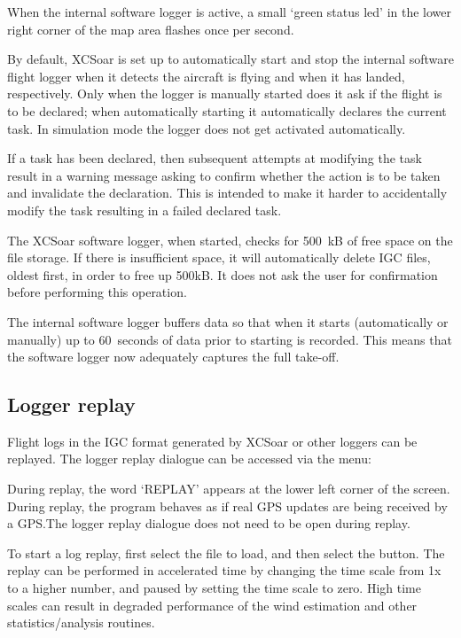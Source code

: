 When the internal software logger is active, a small `green status led' in the
lower right corner of the map area flashes once per second.

By default, XCSoar is set up to automatically start and stop the
internal software flight logger when it detects the aircraft is flying
and when it has landed, respectively.  Only when the logger is
manually started does it ask if the flight is to be declared; when
automatically starting it automatically declares the current task.
In simulation mode the logger does not get activated automatically.

If a task has been declared, then subsequent attempts at modifying the
task result in a warning message asking to confirm whether the action
is to be taken and invalidate the declaration.  This is intended to
make it harder to accidentally modify the task resulting in a failed
declared task.

The XCSoar software logger, when started, checks for 500~kB of free
space on the file storage.  If there is insufficient space, it will
automatically delete IGC files, oldest first, in order to free up
500kB.  It does not ask the user for confirmation before performing
this operation. \warning{}

The internal software logger buffers data so that when it starts
(automatically or manually) up to 60~seconds of data prior to starting
is recorded.  This means that the software logger now adequately
captures the full take-off.

\subsection*{Logger replay}\label{sec:logger-replay}
Flight logs in the IGC format generated by XCSoar or other loggers can
be replayed.  The logger replay dialogue can be accessed via the
menu:
\begin{quote}
\blink{}
\end{quote}

During replay, the word `REPLAY' appears at the lower left corner of
the screen.  During replay, the program behaves as if real GPS updates
are being received by a GPS.\@  The logger replay dialogue does not need
to be open during replay.

To start a log replay, first select the file to load, and then select the
 button.  The replay can be performed in accelerated time
by changing the time scale from 1x to a higher number, and paused by
setting the time scale to zero.  High time scales can result in degraded
performance of the wind estimation and other statistics/analysis routines.

